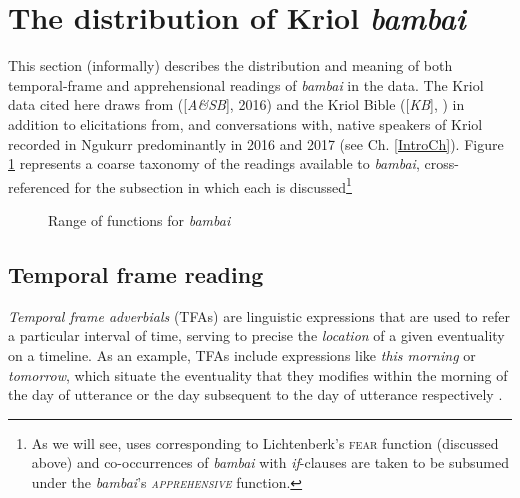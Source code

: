 \section{The distribution of Kriol \textit{bambai}}\reversemarginpar
This section (informally) describes the distribution and meaning of both temporal-frame and apprehensional readings of \textit{bambai} in the data.  The Kriol data cited here draws from \citeauthor{Angelo2016} ([\textit{A\&SB}], 2016) and the Kriol Bible ([\textit{KB}], \citealp{TheBibleSocietyinAustralia2007}) in addition to elicitations from, and conversations with, native speakers of Kriol recorded in Ngukurr predominantly in 2016 and 2017 (see Ch. \ref{IntroCh}). Figure \ref{bb-dist} represents a coarse taxonomy of the readings available to \textit{bambai}, cross-referenced for the subsection in which each is discussed\footnote{As we will see, uses corresponding to Lichtenberk's \textsc{fear} function (discussed above) and co-occurrences of \textit{bambai} with \textit{if}-clauses are taken to be subsumed under the \textit{bambai}'s \textsc{\textit{apprehensive}} function.}

\begin{figure}[h]\caption{Range of functions for \textit{bambai}}\centering\label{bb-dist}
\end{figure}


	\subsection{Temporal frame reading}\label{dataStfa}
\textit{Temporal frame adverbials} (TFAs) are linguistic expressions that are used to refer a particular interval of time, serving to precise the \textit{location} of a given eventuality on a timeline. As an example, TFAs include expressions like \textit{this morning} or \textit{tomorrow}, which situate the eventuality that they modifies within the morning of the day of utterance or the day subsequent to the day of utterance respectively \citep[see][307]{Binnick1991}. 

